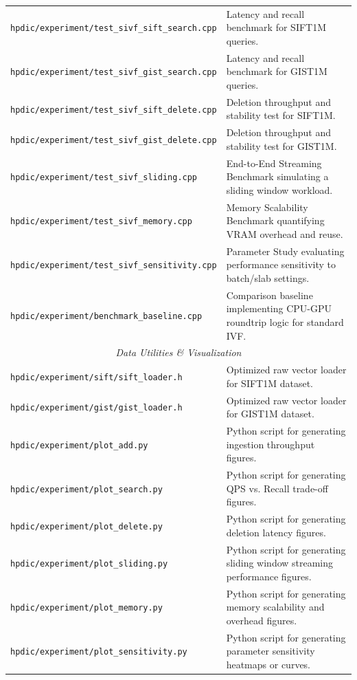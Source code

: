 \documentclass[sigconf,nonacm]{acmart}
\theoremstyle{plain}
\theoremstyle{definition}
\theoremstyle{remark}
\begin{document}
\begin{table}[t]
\begin{tabular}{l|p{10.5cm}}
    \texttt{hpdic/experiment/test\_sivf\_sift\_search.cpp} & Latency and recall benchmark for SIFT1M queries. \\
    \texttt{hpdic/experiment/test\_sivf\_gist\_search.cpp} & Latency and recall benchmark for GIST1M queries. \\
    \texttt{hpdic/experiment/test\_sivf\_sift\_delete.cpp} & Deletion throughput and stability test for SIFT1M. \\
    \texttt{hpdic/experiment/test\_sivf\_gist\_delete.cpp} & Deletion throughput and stability test for GIST1M. \\
    \texttt{hpdic/experiment/test\_sivf\_sliding.cpp} & End-to-End Streaming Benchmark simulating a sliding window workload. \\
    \texttt{hpdic/experiment/test\_sivf\_memory.cpp} & Memory Scalability Benchmark quantifying VRAM overhead and reuse. \\
    \texttt{hpdic/experiment/test\_sivf\_sensitivity.cpp} & Parameter Study evaluating performance sensitivity to batch/slab settings. \\
    \texttt{hpdic/experiment/benchmark\_baseline.cpp} & Comparison baseline implementing CPU-GPU roundtrip logic for standard IVF. \\
    \hline
    \multicolumn{2}{c}{\textit{Data Utilities \& Visualization}} \\
    \hline
    \texttt{hpdic/experiment/sift/sift\_loader.h} & Optimized raw vector loader for SIFT1M dataset. \\
    \texttt{hpdic/experiment/gist/gist\_loader.h} & Optimized raw vector loader for GIST1M dataset. \\
    \texttt{hpdic/experiment/plot\_add.py} & Python script for generating ingestion throughput figures. \\
    \texttt{hpdic/experiment/plot\_search.py} & Python script for generating QPS vs. Recall trade-off figures. \\
    \texttt{hpdic/experiment/plot\_delete.py} & Python script for generating deletion latency figures. \\
    \texttt{hpdic/experiment/plot\_sliding.py} & Python script for generating sliding window streaming performance figures. \\
    \texttt{hpdic/experiment/plot\_memory.py} & Python script for generating memory scalability and overhead figures. \\
    \texttt{hpdic/experiment/plot\_sensitivity.py} & Python script for generating parameter sensitivity heatmaps or curves. \\
    \hline
    \end{tabular}
\end{table}
\end{document}
